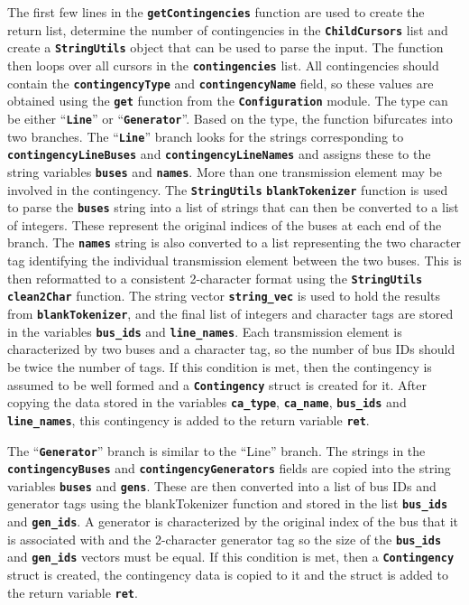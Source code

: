 The first few lines in the \texttt{\textbf{getContingencies}} function are used
to create the return list, determine the number of contingencies in the
\texttt{\textbf{ChildCursors}} list and create a \texttt{\textbf{StringUtils}}
object that can be used to parse the input. The function then loops over all
cursors in the \texttt{\textbf{contingencies}} list. All contingencies should
contain the \texttt{\textbf{contingencyType}} and
\texttt{\textbf{contingencyName}} field, so these values are obtained using the
\texttt{\textbf{get}} function from the \texttt{\textbf{Configuration}} module.
The type can be either ``\texttt{\textbf{Line}}'' or
``\texttt{\textbf{Generator}}''. Based on the type, the function bifurcates into
two branches. The ``\texttt{\textbf{Line}}'' branch looks for the strings
corresponding to \texttt{\textbf{contingencyLineBuses}} and
\texttt{\textbf{contingencyLineNames}} and assigns these to the string variables
\texttt{\textbf{buses}} and \texttt{\textbf{names}}. More than one transmission
element may be involved in the contingency. The \texttt{\textbf{StringUtils}}
\texttt{\textbf{blankTokenizer}} function is used to parse the
\texttt{\textbf{buses}} string into a list of strings that can then be converted
to a list of integers. These represent the original indices of the buses at each
end of the branch. The \texttt{\textbf{names}} string is also converted to a
list representing the two character tag identifying the individual transmission
element between the two buses. This is then reformatted to a consistent
2-character format using the \texttt{\textbf{StringUtils}}
\texttt{\textbf{clean2Char}} function. The string vector
\texttt{\textbf{string\_vec}} is used to hold the results from
\texttt{\textbf{blankTokenizer}}, and the final list of integers and character
tags are stored in the variables \texttt{\textbf{bus\_ids}} and
\texttt{\textbf{line\_names}}. Each transmission element is characterized by two
buses and a character tag, so the number of bus IDs should be twice the number
of tags. If this condition is met, then the contingency is assumed to be well
formed and a \texttt{\textbf{Contingency}} struct is created for it. After
copying the data stored in the variables \texttt{\textbf{ca\_type}},
\texttt{\textbf{ca\_name}}, \texttt{\textbf{bus\_ids}} and \texttt{\textbf{line\_names}}, this contingency is added to the return variable \texttt{\textbf{ret}}.

The ``\texttt{\textbf{Generator}}'' branch is similar to the ``Line'' branch.
The strings in the \texttt{\textbf{contingencyBuses}} and
\texttt{\textbf{contingencyGenerators}} fields are copied into the string
variables \texttt{\textbf{buses}} and \texttt{\textbf{gens}}. These are then
converted into a list of bus IDs and generator tags using the blankTokenizer
function and stored in the list \texttt{\textbf{bus\_ids}} and
\texttt{\textbf{gen\_ids}}. A generator is characterized by the original index of the bus that it is associated with and the 2-character generator tag so the size of the \texttt{\textbf{bus\_ids}} and \texttt{\textbf{gen\_ids}} vectors must be equal. If this condition is met, then a \texttt{\textbf{Contingency}} struct is created, the contingency data is copied to it and the struct is added to the return variable \texttt{\textbf{ret}}.


